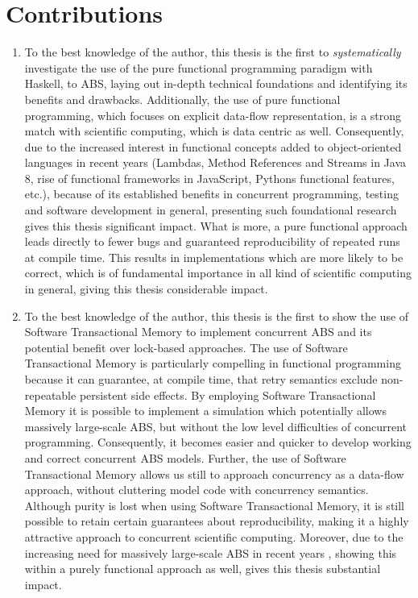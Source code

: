 \section{Contributions}
\begin{enumerate}
	\item To the best knowledge of the author, this thesis is the first to \textit{systematically} investigate the use of the pure functional programming paradigm with Haskell, to ABS, laying out in-depth technical foundations and identifying its benefits and drawbacks. Additionally, the use of pure functional programming, which focuses on explicit data-flow representation, is a strong match with scientific computing, which is data centric as well. Consequently, due to the increased interest in functional concepts added to object-oriented languages in recent years (Lambdas, Method References and Streams in Java 8, rise of functional frameworks in JavaScript, Pythons functional features, etc.), because of its established benefits in concurrent programming, testing and software development in general, presenting such foundational research gives this thesis significant impact. What is more, a pure functional approach leads directly to fewer bugs and guaranteed reproducibility of repeated runs at compile time. This results in implementations which are more likely to be correct, which is of fundamental importance in all kind of scientific computing in general, giving this thesis considerable impact.
	
	\item To the best knowledge of the author, this thesis is the first to show the use of Software Transactional Memory to implement concurrent ABS and its potential benefit over lock-based approaches. The use of Software Transactional Memory is particularly compelling in functional programming because it can guarantee, at compile time, that retry semantics exclude non-repeatable persistent side effects. By employing Software Transactional Memory it is possible to implement a simulation which potentially allows massively large-scale ABS, but without the low level difficulties of concurrent programming. Consequently, it becomes easier and quicker to develop working and correct concurrent ABS models. Further, the use of Software Transactional Memory allows us still to approach concurrency as a data-flow approach, without cluttering model code with concurrency semantics. Although purity is lost when using Software Transactional Memory, it is still possible to retain certain guarantees about reproducibility, making it a highly attractive approach to concurrent scientific computing. Moreover, due to the increasing need for massively large-scale ABS in recent years \cite{lysenko_framework_2008}, showing this within a purely functional approach as well, gives this thesis substantial impact.
	

\end{enumerate}
